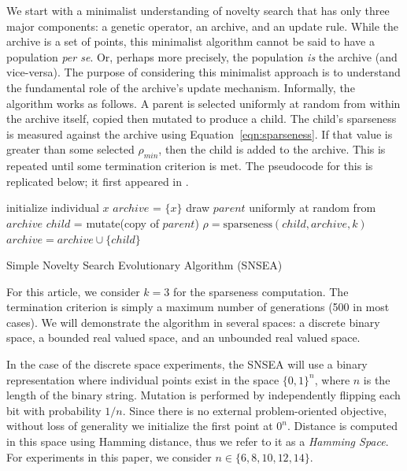 \documentclass[twoside]{article}
\begin{document}
We start with a minimalist understanding of novelty search that has only three major components: a genetic operator, an archive, and an update rule.  While the archive is a set of points, this minimalist algorithm cannot be said to have a population \textit{per se}.  Or, perhaps more precisely, the population \emph{is} the archive (and vice-versa).  The purpose of considering this minimalist approach is to understand the fundamental role of the archive's update mechanism.  Informally, the algorithm works as follows.  A parent is selected uniformly at random from within the archive itself, copied then mutated to produce a child.  The child's sparseness is measured against the archive using Equation~\ref{eqn:sparseness}.  If that value is greater than some selected $\rho_{min}$, then the child is added to the archive.  This is repeated until some termination criterion is met.  The pseudocode for this is replicated below; it first appeared in \citet{Wiegand2020flairs}.

\begin{algorithm}[h]
  \SetAlgoLined
  \DontPrintSemicolon 
  
  \;
    
  initialize individual $x$\;
  $archive$ = $\{x\}$\;
   {
    draw $parent$ uniformly at random from $archive$\;
    $child$ = mutate(copy of $parent$)\;
    $\rho = \mbox{sparseness}(child, archive, k)$\;
     {
      $archive = archive \cup \{child\}$\;
     }
  }
  \caption{Simple Novelty Search Evolutionary Algorithm (SNSEA)}
\end{algorithm}

For this article, we consider $k=3$ for the sparseness computation.  The termination criterion is simply a maximum number of generations (500 in most cases).  We will demonstrate the algorithm in several spaces: a discrete binary space, a bounded real valued space, and an unbounded real valued space.  

In the case of the discrete space experiments, the SNSEA will use a binary representation where individual points exist in the space $\{0,1\}^n$, where $n$ is the length of the binary string.  Mutation is performed by independently flipping each bit with probability $1/n$.  Since there is no external problem-oriented objective, without loss of generality we initialize the first point at $0^n$.  Distance is computed in this space using Hamming distance, thus we refer to it as a \emph{Hamming Space}.  For experiments in this paper, we consider $n\in\{6,8,10,12,14\}$.
\end{document}
